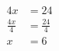 \documentclass[varwidth]{standalone}
\begin{document}
    \begin{varwidth}{0.25\paperwidth}
    \begin{align*}
    4x &= 24\\
    \frac{4x}{4} &= \frac{24}{4}\\
    x &= 6\\
\end{align*}
\end{varwidth}
\end{document}
